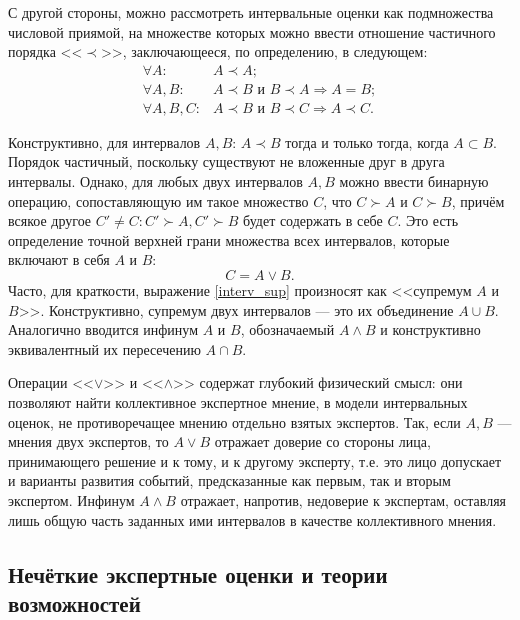С другой стороны, можно рассмотреть интервальные оценки как подмножества числовой приямой, на множестве которых можно ввести отношение частичного порядка <<$\prec$>>, заключающееся, по определению, в следующем:
\begin{equation}
\label{interv_order}
\begin{split}
\forall A: & A \prec A; \\
\forall A, B: & A \prec B \text{ и } B \prec A \Rightarrow A = B; \\
\forall A, B, C: & A \prec B \text{ и } B \prec C \Rightarrow A \prec C.
\end{split}
\end{equation}

Конструктивно, для интервалов $A, B$:  $A \prec B$ тогда и только тогда, когда $A \subset B$. Порядок частичный, поскольку существуют не вложенные друг в друга интервалы. Однако, для любых двух интервалов $A, B$ можно ввести бинарную операцию, сопоставляющую им такое множество $C$, что $C \succ A$ и $C \succ B$, причём всякое другое $C' \neq C: C' \succ A, C' \succ B$ будет содержать в себе $C$. Это есть определение точной верхней грани множества всех интервалов, которые включают в себя $A$ и $B$:
\begin{equation}
\label{interv_sup}
 C = A \vee B.
\end{equation}
Часто, для краткости, выражение \eqref{interv_sup} произносят как <<супремум  $A$ и $B$>>. Конструктивно, супремум двух интервалов --- это их объединение $A \cup B$. Аналогично вводится инфинум $A$ и $B$, обозначаемый $A \wedge B$ и конструктивно эквивалентный их пересечению $A \cap B$.

Операции <<$\vee$>> и <<$\wedge$>> содержат глубокий физический смысл: они позволяют найти коллективное экспертное мнение, в модели интервальных оценок, не противоречащее мнению отдельно взятых экспертов. Так, если $A, B$ --- мнения двух экспертов, то $A \vee B$ отражает доверие со стороны лица, принимающего решение и к тому, и к другому эксперту, т.е. это лицо допускает и варианты развития событий, предсказанные как первым, так и вторым экспертом. Инфинум  $A \wedge B$ отражает, напротив, недоверие к экспертам, оставляя лишь общую часть заданных ими интервалов в качестве коллективного мнения.

\subsection{Нечёткие экспертные оценки и теории возможностей}

